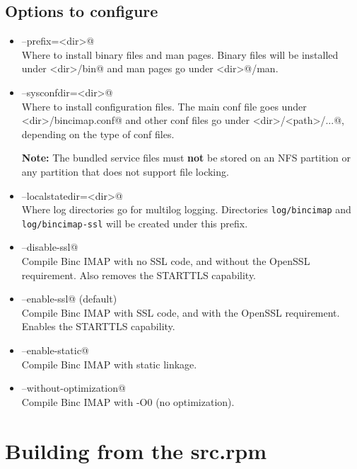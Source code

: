 \documentclass[11pt,a4paper,twoside,openright]{report}
\begin{document}
\subsection{Options to configure}
\label{configureoptions}

\begin{itemize}

\item \Verb@--prefix=<dir>@\\
  Where to install binary files and man pages. Binary files
  will be installed under \Verb@<dir>/bin@ and man pages go
  under \Verb@<dir>@/man.

\item \Verb@--sysconfdir=<dir>@\\
  Where to install configuration files. The main conf file
  goes under \Verb@<dir>/bincimap.conf@ and other conf files
  go under \Verb@<dir>/<path>/...@, depending on the type
  of conf files.

  \textbf{Note:} The bundled service files
  must \textbf{not} be stored on an NFS partition or any partition
  that does not support file locking.

\item \Verb@--localstatedir=<dir>@\\
  Where log directories go for multilog logging. Directories
  \texttt{log/bincimap} and \texttt{log/bincimap-ssl} will be created
  under this prefix.

\item \Verb@--disable-ssl@\\
  Compile Binc IMAP with no SSL code, and without the OpenSSL
  requirement. Also removes the STARTTLS capability.

\item \Verb@--enable-ssl@ (default)\\
  Compile Binc IMAP with SSL code, and with the OpenSSL
  requirement. Enables the STARTTLS capability.

\item \Verb@--enable-static@\\
  Compile Binc IMAP with static linkage.

\item \Verb@--without-optimization@\\
  Compile Binc IMAP with -O0 (no optimization).

\end{itemize}

\section{Building from the src.rpm}
\end{document}
